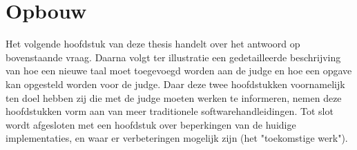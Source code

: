 \section{Opbouw}\label{sec:opbouw}

Het volgende hoofdstuk van deze thesis handelt over het antwoord op bovenstaande vraag.
Daarna volgt ter illustratie een gedetailleerde beschrijving van hoe een nieuwe taal moet toegevoegd worden aan de judge en hoe een opgave kan opgesteld worden voor de judge.
Daar deze twee hoofdstukken voornamelijk ten doel hebben zij die met de judge moeten werken te informeren, nemen deze hoofdstukken vorm aan van meer traditionele softwarehandleidingen.
Tot slot wordt afgesloten met een hoofdstuk over beperkingen van de huidige implementaties, en waar er verbeteringen mogelijk zijn (het "toekomstige werk").
